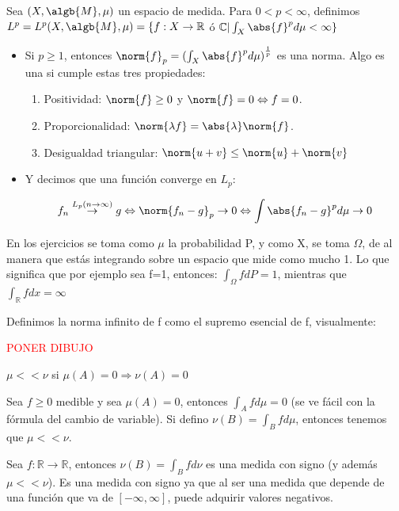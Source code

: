 \documentclass{apuntes}
\begin{document}
\begin{defn}
Sea $(X, \algb{M}, \mu)$ un espacio de medida. Para $0<p<\infty$, definimos $L^p=L^p(X,\algb{M},\mu)=\{f:X\rightarrow \mathbb{R}$ ó $\mathbb{C} | \int_X \abs{f}^p d\mu < \infty\}$

\begin{itemize}
\item Si $p \geq 1$, entonces $\norm{f}_p = (\int_X {\abs{f}^p d\mu)}^{\frac{1}{p}}$ es una norma. Algo es una si cumple estas tres propiedades:
\begin{enumerate}
\item Positividad: $\norm{f}\geq 0$ y $\norm{f} = 0 \Leftrightarrow f=0$.
\item Proporcionalidad: $\norm{\lambda f} = \abs{\lambda}\norm{f}$.
\item Desigualdad triangular: $\norm{u+v} \leq \norm{u}+\norm{v}$     
\end{enumerate}
\item Y decimos que una función converge en $L_p$:

\[
f_n \stackrel{L_p (n\rightarrow \infty)}{\rightarrow} g \Leftrightarrow \norm{f_n -g}_p  \rightarrow 0 \Leftrightarrow \int{\abs{f_n -g}^pd\mu} \rightarrow 0
\]
\end{itemize}

\obs En los ejercicios se toma como $\mu$ la probabilidad P, y como X, se toma $\Omega$, de al manera que estás integrando sobre un espacio que mide como mucho 1. Lo que significa que por ejemplo sea f=1, entonces: $\int_{\Omega}fdP = 1$, mientras que $\int_{\mathbb{R}}fdx = \infty$

\obs Definimos la norma infinito de f como el supremo esencial de f, visualmente:

\textcolor{red}{PONER DIBUJO}

\end{defn}

\begin{defn}
$\mu << \nu$ si $\mu(A)=0 \Rightarrow \nu(A)=0$

\begin{example}
Sea $f \geq 0$ medible y sea $\mu(A)=0$, entonces $\int_Afd\mu=0$ (se ve fácil con la fórmula del cambio de variable). Si defino $\nu(B)=\int_B fd\mu$, entonces tenemos que $\mu << \nu$.
\end{example}
\end{defn}

\begin{defn}
Sea $f:\mathbb{R}\rightarrow \mathbb{R}$, entonces $\nu(B)=\int_B fd\nu$ es una medida con signo (y además $\mu << \nu$). Es una medida con signo ya que al ser una medida que depende de una función que va de $[-\infty, \infty]$, puede adquirir valores negativos.
\end{defn}
\end{document}
